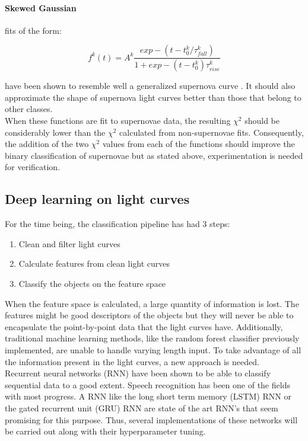 \paragraph{Skewed Gaussian} fits of the form:

\[f^k(t) = A^k \frac{exp-(t-t_0^k/\tau^k_{fall})}{1+exp-(t-t^k_0)\tau^k_{rise}}\]

have been shown to resemble well a generalized supernova curve \cite{sGaussian}. It should also approximate the shape of supernova light curves better than those that belong to other classes.\\

When these functions are fit to supernovae data, the resulting $\chi^2$ should be considerably lower than the $\chi^2$ calculated from non-supernovae fits. Consequently, the addition of the two $\chi^2$  values from each of the functions should improve the binary classification of supernovae but as stated above, experimentation is needed for verification.

\subsection{Deep learning on light curves}

For the time being, the classification pipeline has had 3 steps:

\begin{enumerate}
  \item Clean and filter light curves
  \item Calculate features from clean light curves
  \item Classify the objects on the feature space
\end{enumerate}

When the feature space is calculated, a large quantity of information is lost. The features might be good descriptors of the objects but they will never be able to encapsulate the point-by-point data that the light curves have. Additionally, traditional machine learning methods, like the random forest classifier previously implemented, are unable to handle varying length input. To take advantage of all the information present in the light curves, a new approach is needed.\\

Recurrent neural networks (RNN) have been shown to be able to classify sequential data to a good extent. Speech recognition has been one of the fields with most progress\cite{RNN}. A RNN like the long short term memory (LSTM) RNN or the gated recurrent unit (GRU) RNN are state of the art RNN's that seem promising for this purpose. Thus, several implementations of these networks will be carried out along with their hyperparameter tuning. 

